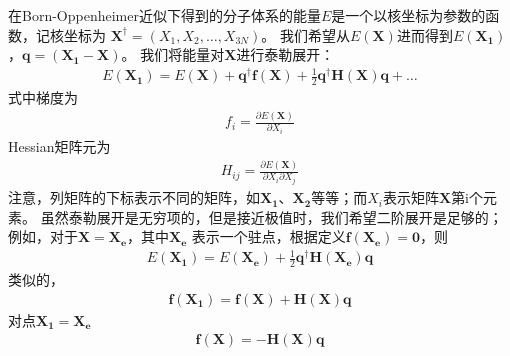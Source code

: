 在Born-Oppenheimer近似下得到的分子体系的能量$E$是一个以核坐标为参数的函数，记核坐标为
$\mathbf{X}^{\dagger}=(X_1,X_2,\dots,X_{3N})$。
我们希望从$E(\mathbf{X})$进而得到$E(\mathbf{X_1})$，$\mathbf{q=(X_1-X)}$。
我们将能量对$\mathbf{X}$进行泰勒展开：
\begin{align}
	\label{C.1}
	E(\mathbf{X_1})=E(\mathbf{X})+\mathbf{q}^{\dagger}\mathbf{f(X)}
                    +\frac{1}{2}\mathbf{q}^{\dagger}\mathbf{H(X)}\mathbf{q}+\dots
\end{align}
式中梯度为
\begin{align}
	f_i=\frac{\partial E(\mathbf{X})}{\partial X_i}
    \nonumber
\end{align}
Hessian矩阵元为
\begin{align}
	H_{ij}=\frac{\partial E(\mathbf{X})}{\partial X_i\partial X_j}
    \nonumber
\end{align}
注意，列矩阵的下标表示不同的矩阵，如$\mathbf{X_1}$、$\mathbf{X_2}$等等；而$X_i$表示矩阵$\mathbf{X}$第i个元素。
虽然泰勒展开是无穷项的，但是接近极值时，我们希望二阶展开是足够的；例如，对于$\mathbf{X}=\mathbf{X_e}$，其中$\mathbf{X_e}$
表示一个驻点，根据定义$\mathbf{f(X_e)=0}$，则
\begin{align}
	\nonumber
	E(\mathbf{X_1})=E(\mathbf{X_e})+\frac{1}{2}\mathbf{q}^{\dagger}\mathbf{H(X_e)}\mathbf{q}
\end{align}
类似的，
\begin{align}
	\label{C.2}
	\mathbf{f(X_1)}=\mathbf{f(X)}+\mathbf{H(X)}\mathbf{q}
\end{align}
对点$\mathbf{X_1}=\mathbf{X_e}$
\begin{align}
	\label{C.3}
	\mathbf{f(X)}=-\mathbf{H(X)}\mathbf{q}
\end{align}

